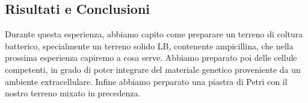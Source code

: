\subsection{Risultati e Conclusioni}

Durante questa esperienza, abbiamo capito come preparare un terreno di coltura batterico,
specialmente un terreno solido LB, contenente ampicillina,
che nella prossima esperienza capiremo a cosa serve.
Abbiamo preparato poi delle cellule competenti,
in grado di poter integrare del materiale genetico proveniente da un ambiente extracellulare.
Infine abbiamo perparato una piastra di Petri con il nostro terreno mixato in precedenza.
